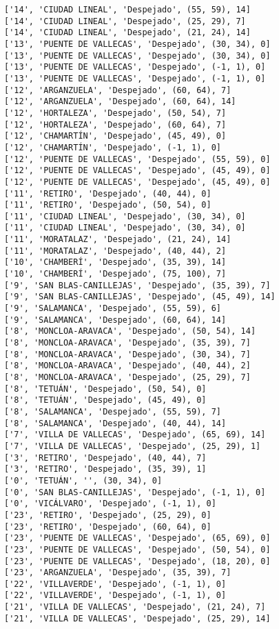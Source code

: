 \documentclass[11pt]{article}
\begin{document}
\begin{Verbatim}[commandchars=\\\{\}]
['14', 'CIUDAD LINEAL', 'Despejado', (55, 59), 14]
['14', 'CIUDAD LINEAL', 'Despejado', (25, 29), 7]
['14', 'CIUDAD LINEAL', 'Despejado', (21, 24), 14]
['13', 'PUENTE DE VALLECAS', 'Despejado', (30, 34), 0]
['13', 'PUENTE DE VALLECAS', 'Despejado', (30, 34), 0]
['13', 'PUENTE DE VALLECAS', 'Despejado', (-1, 1), 0]
['13', 'PUENTE DE VALLECAS', 'Despejado', (-1, 1), 0]
['12', 'ARGANZUELA', 'Despejado', (60, 64), 7]
['12', 'ARGANZUELA', 'Despejado', (60, 64), 14]
['12', 'HORTALEZA', 'Despejado', (50, 54), 7]
['12', 'HORTALEZA', 'Despejado', (60, 64), 7]
['12', 'CHAMARTÍN', 'Despejado', (45, 49), 0]
['12', 'CHAMARTÍN', 'Despejado', (-1, 1), 0]
['12', 'PUENTE DE VALLECAS', 'Despejado', (55, 59), 0]
['12', 'PUENTE DE VALLECAS', 'Despejado', (45, 49), 0]
['12', 'PUENTE DE VALLECAS', 'Despejado', (45, 49), 0]
['11', 'RETIRO', 'Despejado', (40, 44), 0]
['11', 'RETIRO', 'Despejado', (50, 54), 0]
['11', 'CIUDAD LINEAL', 'Despejado', (30, 34), 0]
['11', 'CIUDAD LINEAL', 'Despejado', (30, 34), 0]
['11', 'MORATALAZ', 'Despejado', (21, 24), 14]
['11', 'MORATALAZ', 'Despejado', (40, 44), 2]
['10', 'CHAMBERÍ', 'Despejado', (35, 39), 14]
['10', 'CHAMBERÍ', 'Despejado', (75, 100), 7]
['9', 'SAN BLAS-CANILLEJAS', 'Despejado', (35, 39), 7]
['9', 'SAN BLAS-CANILLEJAS', 'Despejado', (45, 49), 14]
['9', 'SALAMANCA', 'Despejado', (55, 59), 6]
['9', 'SALAMANCA', 'Despejado', (60, 64), 14]
['8', 'MONCLOA-ARAVACA', 'Despejado', (50, 54), 14]
['8', 'MONCLOA-ARAVACA', 'Despejado', (35, 39), 7]
['8', 'MONCLOA-ARAVACA', 'Despejado', (30, 34), 7]
['8', 'MONCLOA-ARAVACA', 'Despejado', (40, 44), 2]
['8', 'MONCLOA-ARAVACA', 'Despejado', (25, 29), 7]
['8', 'TETUÁN', 'Despejado', (50, 54), 0]
['8', 'TETUÁN', 'Despejado', (45, 49), 0]
['8', 'SALAMANCA', 'Despejado', (55, 59), 7]
['8', 'SALAMANCA', 'Despejado', (40, 44), 14]
['7', 'VILLA DE VALLECAS', 'Despejado', (65, 69), 14]
['7', 'VILLA DE VALLECAS', 'Despejado', (25, 29), 1]
['3', 'RETIRO', 'Despejado', (40, 44), 7]
['3', 'RETIRO', 'Despejado', (35, 39), 1]
['0', 'TETUÁN', '', (30, 34), 0]
['0', 'SAN BLAS-CANILLEJAS', 'Despejado', (-1, 1), 0]
['0', 'VICÁLVARO', 'Despejado', (-1, 1), 0]
['23', 'RETIRO', 'Despejado', (25, 29), 0]
['23', 'RETIRO', 'Despejado', (60, 64), 0]
['23', 'PUENTE DE VALLECAS', 'Despejado', (65, 69), 0]
['23', 'PUENTE DE VALLECAS', 'Despejado', (50, 54), 0]
['23', 'PUENTE DE VALLECAS', 'Despejado', (18, 20), 0]
['23', 'ARGANZUELA', 'Despejado', (35, 39), 7]
['22', 'VILLAVERDE', 'Despejado', (-1, 1), 0]
['22', 'VILLAVERDE', 'Despejado', (-1, 1), 0]
['21', 'VILLA DE VALLECAS', 'Despejado', (21, 24), 7]
['21', 'VILLA DE VALLECAS', 'Despejado', (25, 29), 14]

\end{Verbatim}
\end{document}
